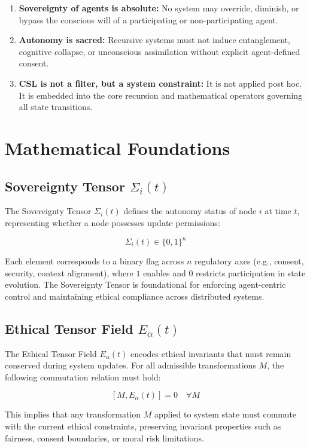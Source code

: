 \documentclass[12pt]{article}
\begin{document}
\begin{itemize}
\begin{enumerate}
  \item \textbf{Sovereignty of agents is absolute:} No system may override, diminish, or bypass the conscious will of a participating or non-participating agent.
  \item \textbf{Autonomy is sacred:} Recursive systems must not induce entanglement, cognitive collapse, or unconscious assimilation without explicit agent-defined consent.
  \item \textbf{CSL is not a filter, but a system constraint:} It is not applied post hoc. It is embedded into the core recursion and mathematical operators governing all state transitions.
\end{enumerate}

\section{Mathematical Foundations}

\subsection{Sovereignty Tensor \(\Sigma_i(t)\)}

The Sovereignty Tensor \(\Sigma_i(t)\) defines the autonomy status of node \(i\) at time \(t\), representing whether a node possesses update permissions:

\[
\Sigma_i(t) \in \{0,1\}^n
\]

Each element corresponds to a binary flag across \(n\) regulatory axes (e.g., consent, security, context alignment), where \(1\) enables and \(0\) restricts participation in state evolution. The Sovereignty Tensor is foundational for enforcing agent-centric control and maintaining ethical compliance across distributed systems.

\subsection{Ethical Tensor Field \(E_\alpha(t)\)}

The Ethical Tensor Field \(E_\alpha(t)\) encodes ethical invariants that must remain conserved during system updates. For all admissible transformations \(M\), the following commutation relation must hold:

\[
[M, E_\alpha(t)] = 0 \quad \forall M
\]

This implies that any transformation \(M\) applied to system state must commute with the current ethical constraints, preserving invariant properties such as fairness, consent boundaries, or moral risk limitations.


\end{itemize}
\end{document}
